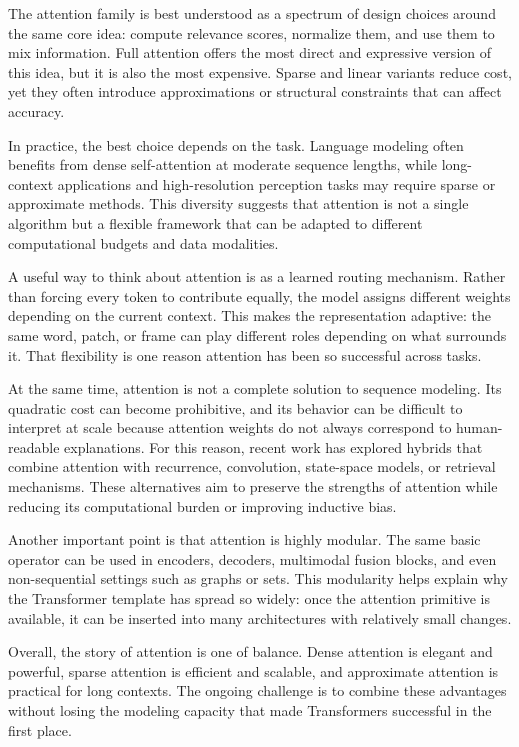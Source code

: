\documentclass[a4paper,11pt]{article}
\begin{document}
The attention family is best understood as a spectrum of design choices around the same core idea: compute relevance scores, normalize them, and use them to mix information. Full attention offers the most direct and expressive version of this idea, but it is also the most expensive. Sparse and linear variants reduce cost, yet they often introduce approximations or structural constraints that can affect accuracy.

In practice, the best choice depends on the task. Language modeling often benefits from dense self-attention at moderate sequence lengths, while long-context applications and high-resolution perception tasks may require sparse or approximate methods. This diversity suggests that attention is not a single algorithm but a flexible framework that can be adapted to different computational budgets and data modalities.

A useful way to think about attention is as a learned routing mechanism. Rather than forcing every token to contribute equally, the model assigns different weights depending on the current context. This makes the representation adaptive: the same word, patch, or frame can play different roles depending on what surrounds it. That flexibility is one reason attention has been so successful across tasks.

At the same time, attention is not a complete solution to sequence modeling. Its quadratic cost can become prohibitive, and its behavior can be difficult to interpret at scale because attention weights do not always correspond to human-readable explanations. For this reason, recent work has explored hybrids that combine attention with recurrence, convolution, state-space models, or retrieval mechanisms. These alternatives aim to preserve the strengths of attention while reducing its computational burden or improving inductive bias.

Another important point is that attention is highly modular. The same basic operator can be used in encoders, decoders, multimodal fusion blocks, and even non-sequential settings such as graphs or sets. This modularity helps explain why the Transformer template has spread so widely: once the attention primitive is available, it can be inserted into many architectures with relatively small changes.

Overall, the story of attention is one of balance. Dense attention is elegant and powerful, sparse attention is efficient and scalable, and approximate attention is practical for long contexts. The ongoing challenge is to combine these advantages without losing the modeling capacity that made Transformers successful in the first place.
\end{document}
